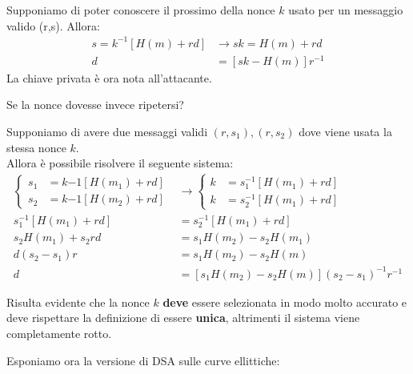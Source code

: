 \begin{corollary}\label{cor:kpred}
Supponiamo di poter conoscere il prossimo della nonce $k$ usato per un messaggio valido (r,s)\footnotemark. Allora:
\begin{align*}
    s=k^{-1}[H(m)+rd]&\longrightarrow sk=H(m)+rd\\
    d&=[sk-H(m)]r^{-1}
\end{align*}
La chiave privata è ora nota all'attacante.
\end{corollary}
Se la nonce dovesse invece ripetersi?
\begin{corollary}\label{cor:krep}
Supponiamo di avere due messaggi validi $(r,s_1),(r,s_2)$ dove viene usata la stessa nonce $k$.\footnotemark\\
Allora è possibile risolvere il seguente sistema:
\begin{equation*}
\begin{aligned}
    \begin{cases}
    s_1&=k{-1}[H(m_1)+rd]\\
    s_2&=k{-1}[H(m_2)+rd]
    \end{cases}
    &\longrightarrow
    \begin{cases}
    k&=s_1^{-1}[H(m_1)+rd]\\
    k&=s_2^{-1}[H(m_1)+rd]
    \end{cases}\\
    s_1^{-1}[H(m_1)+rd]&=s_2^{-1}[H(m_1)+rd]\\
    s_2H(m_1)+s_2rd&=s_1H(m_2)-s_2H(m_1)\\
d(s_2-s_1)r&=s_1H(m_2)-s_2H(m)\\
d&=[s_1H(m_2)-s_2H(m)](s_2-s_1)^{-1}r^{-1}
    \end{aligned}
\end{equation*}
\end{corollary}
\begin{remark}
Risulta evidente che la nonce $k$ \textbf{deve} essere selezionata in modo molto accurato e deve rispettare la definizione di essere \textbf{unica}, altrimenti il sistema viene completamente rotto.
\end{remark}
Esponiamo ora la versione di DSA sulle curve ellittiche:
